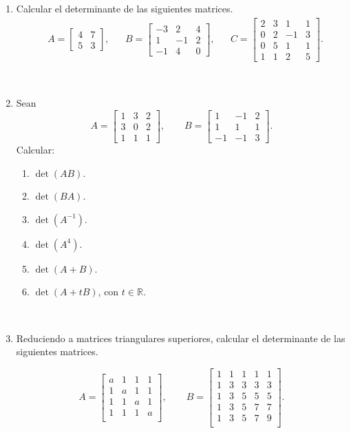 \documentclass[12pt]{amsart}
\begin{document}
\begin{enumerate}
\item Calcular el determinante de las siguientes matrices.
	\begin{align*}
	&A=\begin{bmatrix} 4&7\\ 5&3\end{bmatrix},
	&&B=\begin{bmatrix} -3&2&4\\ 1&-1&2\\ -1&4&0\end{bmatrix},
	&&
	C=\begin{bmatrix} 2&3&1&1\\ 0&2&-1&3 \\ 0&5&1&1 \\1&1&2&5\end{bmatrix}.
	\end{align*}

\

\item Sean
		$$A=
	\begin{bmatrix}
		1&3&2 \\
		3&0&2 \\
		1&1&1
	\end{bmatrix}, \qquad
	B =
	\begin{bmatrix}
		1&-1&2\\
		1&1&1 \\
		-1&-1&3
	\end{bmatrix}.
	$$
	Calcular:
	\begin{multicols}{3}
	\begin{enumerate}
		\item $\det(AB)$.
		\item $\det(BA)$.
		\item $\det(A^{-1})$.
		\item $\det(A^{4})$.
		\item $\det(A+B)$.
		\item $\det(A+tB)$, con $t \in \mathbb{R}$.
	\end{enumerate}
\end{multicols}


\

\item Reduciendo a matrices triangulares superiores, calcular el determinante de las siguientes matrices.

		$$A =
		\begin{bmatrix}
			a&1&1&1 \\
			1&a&1&1 \\
			1&1&a&1 \\
			1&1&1&a \\
		\end{bmatrix}, \qquad	
        B =
		\begin{bmatrix}
			1&1&1&1&1 \\
			1&3&3&3&3 \\
			1&3&5&5&5 \\
			1&3&5&7&7 \\
			1&3&5&7&9 \\
		\end{bmatrix}.
		$$


\end{enumerate}
\end{document}
